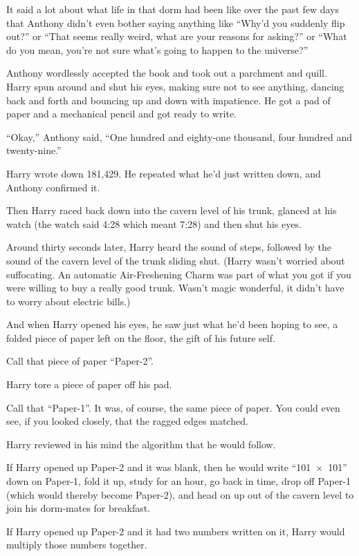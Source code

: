 It said a lot about what life in that dorm had been like over the past few days that Anthony didn’t even bother saying anything like
“Why’d you suddenly flip out?” or
“That seems really weird, what are your reasons for asking?” or
“What do you mean, you’re not sure what’s going to happen to the universe?”

Anthony wordlessly accepted the book and took out a parchment and quill. Harry spun around and shut his eyes, making sure not to see anything, dancing back and forth and bouncing up and down with impatience. He got a pad of paper and a mechanical pencil and got ready to write.

“Okay,” Anthony said,
“One hundred and eighty-one thousand, four hundred and twenty-nine.”

Harry wrote down 181,429. He repeated what he’d just written down, and Anthony confirmed it.

Then Harry raced back down into the cavern level of his trunk, glanced at his watch (the watch said 4:28 which meant 7:28) and then shut his eyes.

Around thirty seconds later, Harry heard the sound of steps, followed by the sound of the cavern level of the trunk sliding shut. (Harry wasn’t worried about suffocating. An automatic Air-Freshening Charm was part of what you got if you were willing to buy a really good trunk. Wasn’t magic wonderful, it didn’t have to worry about electric bills.)

And when Harry opened his eyes, he saw just what he’d been hoping to see, a folded piece of paper left on the floor, the gift of his future self.

Call that piece of paper
“Paper-2”.

Harry tore a piece of paper off his pad.

Call that
“Paper-1”. It was, of course, the same piece of paper. You could even see, if you looked closely, that the ragged edges matched.

Harry reviewed in his mind the algorithm that he would follow.

If Harry opened up Paper-2 and it was blank, then he would write “101~$\times$~101” down on Paper-1, fold it up, study for an hour, go back in time, drop off Paper-1 (which would thereby become Paper-2), and head on up out of the cavern level to join his dorm-mates for breakfast.

If Harry opened up Paper-2 and it had two numbers written on it, Harry would multiply those numbers together.


